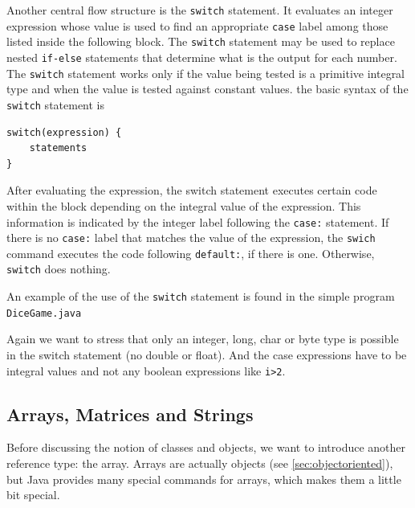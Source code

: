 Another central flow structure is the \verb|switch| statement. It
evaluates an integer expression whose value is used to find an
appropriate \verb|case| label among those listed inside the following
block. The \verb|switch| statement may be used to replace nested \verb|if-else|
statements that determine what is the output for each number. The
\verb|switch| statement works only if the value being tested is a
primitive integral type and when the value is tested against constant
values. the basic syntax of the \verb|switch| statement is
\begin{verbatim}
switch(expression) {
    statements
}
\end{verbatim}
After evaluating the expression, the switch statement executes
certain code within the block depending on the integral value of the
expression. This information is indicated by the integer label following
the \verb|case:| statement. If there is no \verb|case:| label that
matches the value of the expression, the \verb|swich| command executes
the code following \verb|default:|, if there is one. Otherwise,
\verb|switch| does nothing.

An example of the use of the \verb|switch| statement is found in the
simple program \verb|DiceGame.java| 


Again we want to stress that only an integer, long, char or byte type
is possible in the switch statement (no double or float). And the
case expressions have to be integral values and not any boolean
expressions like \verb|i>2|. 


\subsection{Arrays, Matrices and Strings}
\label{sec:Arrays}

Before discussing the notion of classes and objects, we want to introduce
another reference type: the array. Arrays are actually objects
(see \ref{sec:objectoriented}), but
Java provides many special commands for arrays, which makes them a 
little bit special.


